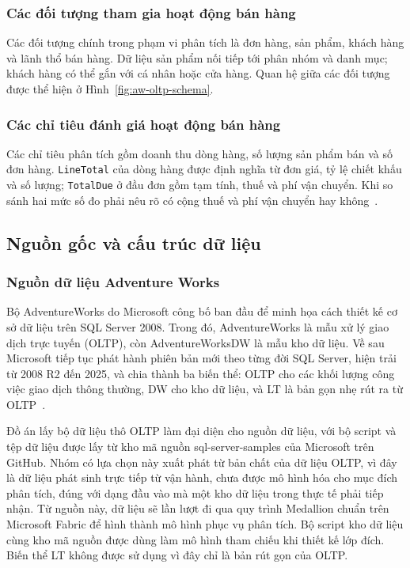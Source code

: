 \subsubsection{Các đối tượng tham gia hoạt động bán hàng}
Các đối tượng chính trong phạm vi phân tích là đơn hàng, sản phẩm, khách hàng và lãnh thổ bán hàng. Dữ liệu sản phẩm nối tiếp tới phân nhóm và danh mục; khách hàng có thể gắn với cá nhân hoặc cửa hàng. Quan hệ giữa các đối tượng được thể hiện ở Hình~\ref{fig:aw-oltp-schema}.
\subsubsection{Các chỉ tiêu đánh giá hoạt động bán hàng}
Các chỉ tiêu phân tích gồm doanh thu dòng hàng, số lượng sản phẩm bán và số đơn hàng. \texttt{LineTotal} của dòng hàng được định nghĩa từ đơn giá, tỷ lệ chiết khấu và số lượng; \texttt{TotalDue} ở đầu đơn gồm tạm tính, thuế và phí vận chuyển. Khi so sánh hai mức số đo phải nêu rõ có cộng thuế và phí vận chuyển hay không~\citep{aw-samples}.
\subsection{Nguồn gốc và cấu trúc dữ liệu}
\subsubsection{Nguồn dữ liệu Adventure Works}

Bộ AdventureWorks do Microsoft công bố ban đầu để minh họa cách thiết kế cơ sở dữ liệu trên SQL Server 2008. Trong đó, AdventureWorks là mẫu xử lý giao dịch trực tuyến (OLTP), còn AdventureWorksDW là mẫu kho dữ liệu. Về sau Microsoft tiếp tục phát hành phiên bản mới theo từng đời SQL Server, hiện trải từ 2008 R2 đến 2025, và chia thành ba biến thể: OLTP cho các khối lượng công việc giao dịch thông thường, DW cho kho dữ liệu, và LT là bản gọn nhẹ rút ra từ OLTP~\citep{aw-samples}.

Đồ án lấy bộ dữ liệu thô OLTP làm đại diện cho nguồn dữ liệu, với bộ script và tệp dữ liệu được lấy từ kho mã nguồn sql-server-samples của Microsoft trên GitHub. Nhóm có lựa chọn này xuất phát từ bản chất của dữ liệu OLTP, vì đây là dữ liệu phát sinh trực tiếp từ vận hành, chưa được mô hình hóa cho mục đích phân tích, đúng với dạng đầu vào mà một kho dữ liệu trong thực tế phải tiếp nhận. Từ nguồn này, dữ liệu sẽ lần lượt đi qua quy trình Medallion chuẩn trên Microsoft Fabric để hình thành mô hình phục vụ phân tích. Bộ script kho dữ liệu cùng kho mã nguồn được dùng làm mô hình tham chiếu khi thiết kế lớp đích. Biến thể LT không được sử dụng vì đây chỉ là bản rút gọn của OLTP.

